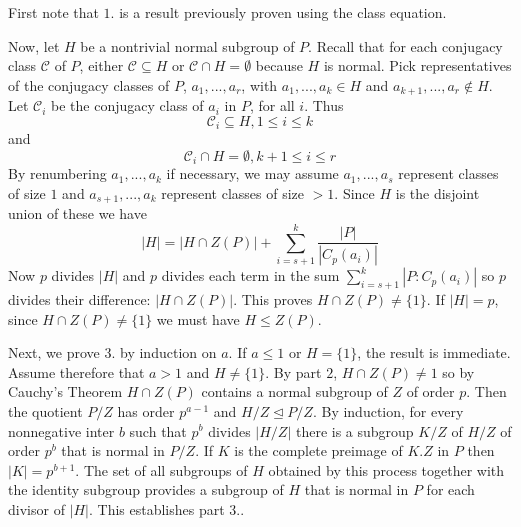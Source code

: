 \documentclass[12pt, a4paper, twoside, openright, titlepage]{book}
\begin{document}
\begin{proof*}{}{}
    First note that $1.$ is a result previously proven using the class equation.

    Now, let $H$ be a nontrivial normal subgroup of $P$. Recall that for each conjugacy class $\mathcal{C}$ of $P$, either $\mathcal{C} \subseteq H$ or $\mathcal{C} \cap H = \emptyset$ because $H$ is normal. Pick representatives of the conjugacy classes of $P$, $a_1,...,a_r$, with $a_1,...,a_k \in H$ and $a_{k+1},...,a_r \notin H$. Let $\mathcal{C}_i$ be the conjugacy class of $a_i$ in $P$, for all $i$. Thus \begin{equation*}
        \mathcal{C}_i \subseteq H, 1 \leq i \leq k
    \end{equation*}
    and \begin{equation*}
        \mathcal{C}_i\cap H = \emptyset, k+1\leq i \leq r
    \end{equation*}
    By renumbering $a_1,...,a_k$ if necessary, we may assume $a_1,...,a_s$ represent classes of size $1$ and $a_{s+1},...,a_k$ represent classes of size $> 1$. Since $H$ is the disjoint union of these we have \begin{equation*}
        |H| = |H\cap Z(P)| + \sum\limits_{i=s+1}^k\frac{|P|}{|C_p(a_i)|}
    \end{equation*}
    Now $p$ divides $|H|$ and $p$ divides each term in the sum $\sum_{i=s+1}^k|P:C_p(a_i)|$ so $p$ divides their difference: $|H\cap Z(P)|$. This proves $H\cap Z(P) \neq \{1\}$. If $|H| = p$, since $H\cap Z(P) \neq \{1\}$ we must have $H \leq Z(P)$. 

    Next, we prove $3.$ by induction on $a$. If $a \leq 1$ or $H = \{1\}$, the result is immediate. Assume therefore that $a > 1$ and $H \neq \{1\}$. By part $2$, $H\cap Z(P) \neq 1$ so by Cauchy's Theorem $H\cap Z(P)$ contains a normal subgroup of $Z$ of order $p$. Then the quotient $P/Z$ has order $p^{a-1}$ and $H/Z\trianglelefteq P/Z$. By induction, for every nonnegative inter $b$ such that $p^b$ divides $|H/Z|$ there is a subgroup $K/Z$ of $H/Z$ of order $p^b$ that is normal in $P/Z$. If $K$ is the complete preimage of $K.Z$ in $P$ then $|K| = p^{b+1}$. The set of all subgroups of $H$ obtained by this process together with the identity subgroup provides a subgroup of $H$ that is normal in $P$ for each divisor of $|H|$. This establishes part $3.$.


\end{proof*}
\end{document}
